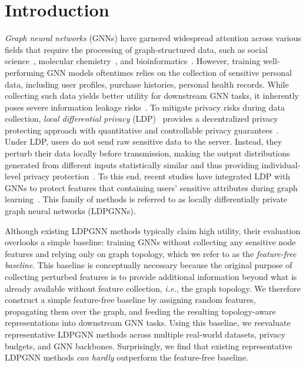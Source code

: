 \documentclass[conference,compsoc]{IEEEtran}
\newcommand{\ie}{\textit{i.e.}\xspace}
\theoremstyle{boldplain}
\theoremstyle{bolddefinition}
\theoremstyle{remark}
\newcommand{\ldpgnn}{LDPGNN\xspace}
\newcommand{\ldpgnns}{LDPGNNs\xspace}
\begin{document}
\IEEEpeerreviewmaketitle



\section{Introduction}
\label{sec:introduction}


\textit{Graph neural networks} (GNNs) have garnered widespread attention across various fields that require the processing of graph-structured data, such as social science~\cite{hamilton2017graphsage}, molecular chemistry~\cite{duvenaud2015molecularfingerprints}, and bioinformatics~\cite{fout2017proteininterface}.
However, training well-performing GNN models oftentimes relies on the collection of sensitive personal data, including user profiles, purchase histories, personal health records. 
While collecting such data yields better utility for downstream GNN tasks, it inherently poses severe information leakage risks~\cite{meng2023devil,zhang2022inferenceattacks,wang2022gpiagnn,shen2022modelstealing}. 
To mitigate privacy risks during data collection, \textit{local differential privacy} (LDP)~\cite{wang2017locally} provides a decentralized privacy protecting approach with quantitative and controllable privacy guarantees~\cite{erlingsson2014rappor,ding2017telemetry,wang2019ldpmultidim}.
Under LDP, users do not send raw sensitive data to the server.
Instead, they perturb their data locally before transmission, making the output distributions generated from different inputs statistically similar and thus providing individual-level privacy protection~\cite{wang2017locally}.
To this end, recent studies have integrated LDP with GNNs to protect features that containing users' sensitive attributes during graph learning~\cite{lpgNN,lin2022solitude,pei2024lgapgnn,jin2022gromov}.
This family of methods is referred to as locally differentially private graph neural networks (\ldpgnns).


Although existing \ldpgnn methods typically claim high utility, their evaluation overlooks a simple baseline: training GNNs without collecting any sensitive node features and relying only on graph topology, 
which we refer to as the \textit{feature-free baseline}. 
This baseline is conceptually necessary because the original purpose of collecting perturbed features is to provide additional information beyond what is already available without feature collection, \ie, the graph topology.
We therefore construct a simple feature-free baseline by assigning random features, propagating them over the graph, and feeding the resulting topology-aware representations into downstream GNN tasks.
Using this baseline, we reevaluate representative \ldpgnn methods across multiple real-world datasets, privacy budgets, and GNN backbones. 
Surprisingly, we find that existing representative \ldpgnn methods \textit{can hardly} outperform the feature-free baseline.
\end{document}
